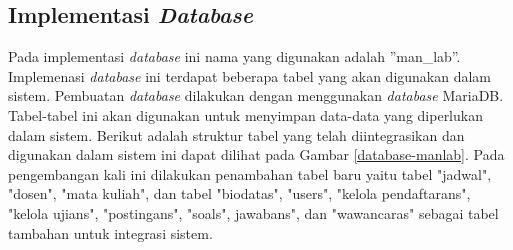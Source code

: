 \subsection{Implementasi \textit{Database}}
Pada implementasi \textit{database} ini nama yang digunakan adalah ”man\_lab”. Implemenasi \textit{database} ini terdapat beberapa tabel yang akan digunakan dalam sistem. Pembuatan \textit{database} dilakukan dengan menggunakan \textit{database} MariaDB. Tabel-tabel ini akan digunakan untuk menyimpan data-data yang diperlukan dalam sistem. Berikut adalah struktur tabel yang telah diintegrasikan dan digunakan dalam sistem ini dapat dilihat pada Gambar \ref{database-manlab}. Pada pengembangan kali ini dilakukan penambahan tabel baru yaitu tabel "jadwal", "dosen", "mata kuliah", dan tabel  "biodatas", "users", "kelola pendaftarans", "kelola ujians", "postingans", "soals", jawabans", dan "wawancaras" sebagai tabel tambahan untuk integrasi sistem.

